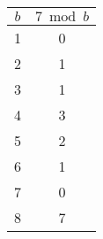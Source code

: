 \begin{minipage}{0.32\textwidth}
    \centering
    \begin{tabular}{c|c}
        \rowcolor{OliveGreen!10}$b$ & $7 \bmod b$ \\
        \hline
        1                           & 0           \\
        2                           & 1           \\
        3                           & 1           \\
        4                           & 3           \\
        5                           & 2           \\
        6                           & 1           \\
        7                           & 0           \\
        8                           & 7           \\
    \end{tabular}
\end{minipage}

\vfill
\newpage


